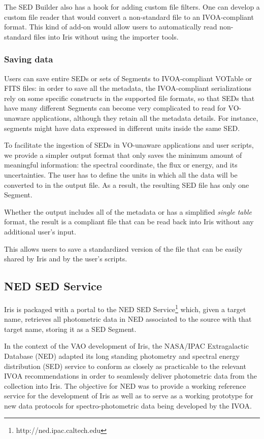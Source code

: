 \documentclass[final,5p]{elsarticle}
\begin{document}
The SED Builder also has a hook for adding custom file filters. One can develop a custom file reader that would convert a non-standard file to an IVOA-compliant format. This kind of add-on would allow users to automatically read non-standard files into Iris without using the importer tools.

\subsubsection{Saving data}
Users can save entire SEDs or sets of Segments to IVOA-compliant VOTable or FITS files: in order to save all the metadata, the IVOA-compliant serializations rely on some specific constructs in the supported file formats, so that SEDs that have many different Segments can become very complicated to read for VO-unaware applications, although they retain all the metadata details. For instance, segments might have data expressed in different units inside the same SED.

To facilitate the ingestion of SEDs in VO-unaware applications and user scripts, we provide a simpler output format that only saves the minimum amount of meaningful information: the spectral coordinate, the flux or energy, and its uncertainties. The user has to define the units in which all the data will be converted to in the output file. As a result, the resulting SED file has only one Segment.

Whether the output includes all of the metadata or has a simplified \emph{single table} format, the result is a compliant file that can be read back into Iris without any additional user's input.

This allows users to save a standardized version of the file that can be easily shared by Iris and by the user's scripts.

\subsection{NED SED Service}
\label{subsec:ned}

Iris is packaged with a portal to the NED SED Service\footnote{http://ned.ipac.caltech.edu} which, given a target name, retrieves all photometric data in NED associated to the source with that target name, storing it as a SED Segment.

In the context of the VAO development of Iris, the NASA/IPAC Extragalactic Database (NED) adapted its long standing photometry and spectral energy distribution (SED) service to conform as closely as practicable to the relevant IVOA recommendations in order to seamlessly deliver photometric data from the collection into Iris. The objective for NED was to provide a working reference service for the development of Iris as well as to serve as a working prototype for new data protocols for spectro-photometric data being developed by the IVOA.
\end{document}
